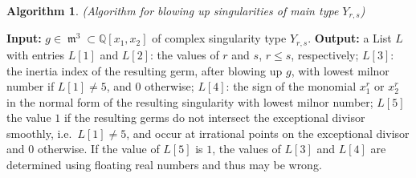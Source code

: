 \documentclass{amsproc}
\DeclareMathOperator{\m}{\mathfrak{m}}
\begin{document}
\newtheorem{BlowUpO}[kjet]{Algorithm}
\begin{BlowUpO}(Algorithm for blowing up singularities of main type $Y_{r,s}$)\label{BlowingUp}
\end{BlowUpO}
\noindent\textnormal{\bf Input:} $g\in\m^3\subset\mathbb Q[x_1,x_2]$ of complex singularity type $Y_{r,s}$.\newline
\textnormal{\bf Output:} a List $L$ with entries $L[1]$ and $L[2]$: the values of $r$ and $s$, $r\le s$, respectively; $L[3]$: the inertia index of the resulting germ, after blowing up $g$, with lowest milnor number if $L[1]\neq 5$, and $0$ otherwise; $L[4]$: the sign of the monomial $x_1^r$ or $x_2^r$ in the normal form of the resulting singularity with lowest milnor number; $L[5]$ the value $1$ if the resulting germs do not intersect the exceptional divisor smoothly, i.e.~$L[1]\neq 5$, and occur at irrational points on the exceptional divisor and $0$ otherwise. If the value of $L[5]$ is $1$, the values of $L[3]$ and $L[4]$ are determined using floating real numbers and thus may be wrong. 
\end{document}
